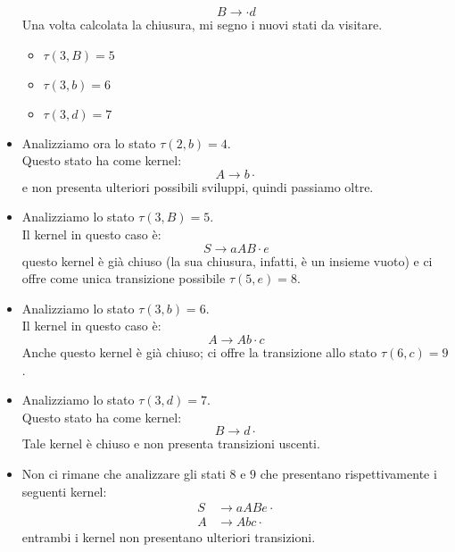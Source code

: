 \documentclass[class=book, crop=false, oneside, 12pt]{standalone}
\begin{document}
\begin{itemize}
    \begin{equation*}
        B \to \cdot d
    \end{equation*}
    Una volta calcolata la chiusura, mi segno i nuovi stati da visitare.
    \begin{itemize}
        \item \(\tau (3, B) = 5\)
        \item \(\tau (3, b) = 6\)
        \item \(\tau (3, d) = 7\)
    \end{itemize}
    \item Analizziamo ora lo stato \(\tau (2, b) = 4\). \\
    Questo stato ha come kernel:
    \begin{equation*}
        A \to b \cdot
    \end{equation*}
    e non presenta ulteriori possibili sviluppi, quindi passiamo oltre.
    \item Analizziamo lo stato \(\tau (3, B) = 5\). \\
    Il kernel in questo caso è:
    \begin{equation*}
        S \to aAB \cdot e
    \end{equation*}
    questo kernel è già chiuso (la sua chiusura, infatti, è un insieme vuoto) e ci offre come unica transizione possibile \(\tau (5, e) = 8\).
    \item Analizziamo lo stato \(\tau (3, b) = 6\). \\
    Il kernel in questo caso è:
    \begin{equation*}
        A \to Ab \cdot c
    \end{equation*}
    Anche questo kernel è già chiuso; ci offre la transizione allo stato \(\tau (6, c) = 9\).
    \item Analizziamo lo stato \(\tau (3, d) = 7\). \\
    Questo stato ha come kernel:
    \begin{equation*}
        B \to d \cdot 
    \end{equation*}
    Tale kernel è chiuso e non presenta transizioni uscenti.
    \item Non ci rimane che analizzare gli stati \(8\) e \(9\) che presentano rispettivamente i seguenti kernel:
    \begin{align*}
        S &\to aABe \cdot \\
        A &\to Abc \cdot
    \end{align*}
    entrambi i kernel non presentano ulteriori transizioni.
\end{itemize}
\end{document}
